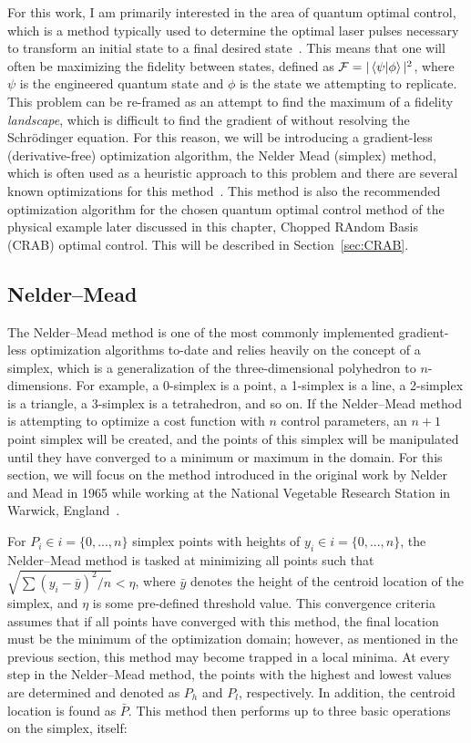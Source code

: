 For this work, I am primarily interested in the area of quantum optimal control, which is a method typically used to determine the optimal laser pulses necessary to transform an initial state to a final desired state~\cite{werschnik2007}.
This means that one will often be maximizing the fidelity between states, defined as $\mathcal{F} = |\braket{\psi|\phi}|^2$, where $\psi$ is the engineered quantum state and $\phi$ is the state we attempting to replicate.
This problem can be re-framed as an attempt to find the maximum of a fidelity \textit{landscape}, which is difficult to find the gradient of without resolving the Schr\"odinger equation.
For this reason, we will be introducing a gradient-less (derivative-free) optimization algorithm, the Nelder Mead (simplex) method, which is often used as a heuristic approach to this problem and there are several known optimizations for this method~\cite{nelder1965,kolda2003,lewis2007}.
This method is also the recommended optimization algorithm for the chosen quantum optimal control method of the physical example later discussed in this chapter, Chopped RAndom Basis (CRAB) optimal control.
This will be described in Section~\ref{sec:CRAB}.

\subsection{Nelder--Mead}
\label{sec:NM}

The Nelder--Mead method is one of the most commonly implemented gradient-less optimization algorithms to-date and relies heavily on the concept of a simplex, which is a generalization of the three-dimensional polyhedron to $n$-dimensions.
For example, a 0-simplex is a point, a 1-simplex is a line, a 2-simplex is a triangle, a 3-simplex is a tetrahedron, and so on.
If the Nelder--Mead method is attempting to optimize a cost function with $n$ control parameters, an $n+1$ point simplex will be created, and the points of this simplex will be manipulated until they have converged to a minimum or maximum in the domain.
For this section, we will focus on the method introduced in the original work by Nelder and Mead in 1965 while working at the National Vegetable Research Station in Warwick, England~\cite{nelder1965}.

For $P_i \in i=\{0,...,n\}$ simplex points with heights of $y_i \in i=\{0,...,n\}$, the Nelder--Mead method is tasked at minimizing all points such that $\sqrt{\sum(y_i-\bar y)^2/n} < \eta$, where $\bar y$ denotes the height of the centroid location of the simplex, and $\eta$ is some pre-defined threshold value.
This convergence criteria assumes that if all points have converged with this method, the final location must be the minimum of the optimization domain; however, as mentioned in the previous section, this method may become trapped in a local minima.
At every step in the Nelder--Mead method, the points with the highest and lowest values are determined and denoted as $P_h$ and $P_l$, respectively.
In addition, the centroid location is found as $\bar P$.
This method then performs up to three basic operations on the simplex, itself:

